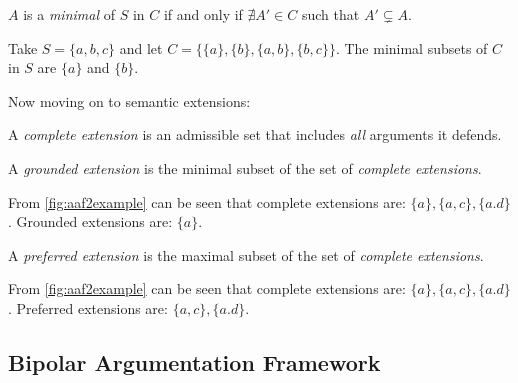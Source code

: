         \begin{definition}
            $A$ is a \textit{minimal} of $S$ in $C$ if and only if $\nexists A' \in C$ such that $A' \subsetneq A$.
            \label{definition:definition6}
        \end{definition}
        \begin{exa}
            Take $S = \{a, b, c\}$ and let $C = \{\{a\}, \{b\}, \{a, b\}, \{b, c\}\}$. The minimal subsets of $C$ in $S$ are $\{a\}$ and $\{b\}$.
            \label{exa:example6}
        \end{exa}
        
        Now moving on to semantic extensions:
        \begin{definition}
            A \textit{complete extension} is an admissible set that includes \textit{all} arguments it defends.
            \label{definition:definition7}
        \end{definition}
        
        \begin{definition}
            A \textit{grounded extension} is the minimal subset of the set of \textit{complete extensions}.
            \label{definition:definition8}
        \end{definition}
        \begin{exa}
            From \autoref{fig:aaf2example} can be seen that complete extensions are: $\{a\}, \{a, c\}, \{a. d\}$. Grounded extensions are: $\{a\}$.
            \label{exa:example8}
        \end{exa}
        
        
        
        \begin{definition}
            A \textit{preferred extension} is the maximal subset of the set of \textit{complete extensions}.
            \label{definition:definition9}
        \end{definition}
        \begin{exa}
            From \autoref{fig:aaf2example} can be seen that complete extensions are: $\{a\}, \{a, c\}, \{a. d\}$. Preferred extensions are: $\{a, c\}, \{a. d\}$.
            \label{exa:example9}
        \end{exa}
        
    \subsection{Bipolar Argumentation Framework}
        